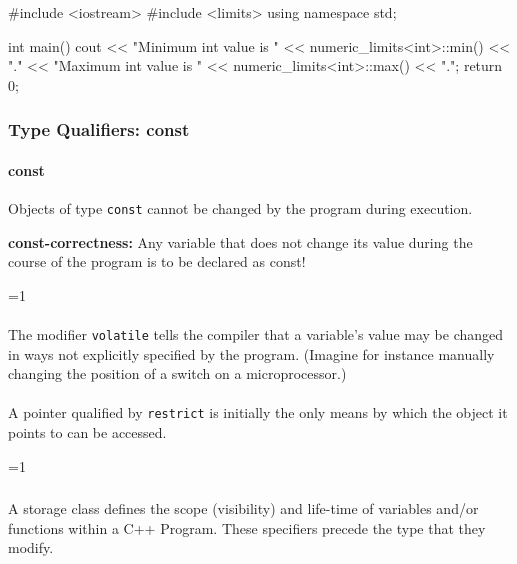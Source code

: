 \documentclass[10pt,a4paper]{scrartcl}
\gdef\conditionmacro{0}
\begin{document}
\begin{multicols*}{2}
\begin{TPCpp}
#include <iostream>
#include <limits>
using namespace std;

int main() {
   cout << "Minimum int value is "
        << numeric_limits<int>::min() << ".\n"
        << "Maximum int value is "
        << numeric_limits<int>::max() << ".\n";
   return 0;
}
\end{TPCpp}

\subsubsection{Type Qualifiers: const }
\label{sec:TypeQualifiersConstVolatileRestrict}


\paragraph{const} Objects of type \verb+const+ cannot be changed by the program during execution.

\vspace{3ex}

\textbf{const-correctness:} Any variable that does not change its value during the course of the program is to be declared as const!

\ifnum\conditionmacro=1
\paragraph{} The modifier \verb+volatile+ tells the compiler that a variable's value may be changed in ways not explicitly specified by the program. (Imagine for instance manually changing the position of a switch on a microprocessor.)
\paragraph{} A pointer qualified by \verb+restrict+ is initially the only means by which the object it points to can be accessed.
\fi

\ifnum\conditionmacro=1
\subsubsection{}
\label{sec:StorageClasses}

A storage class defines the scope (visibility) and life-time of variables and/or functions within a C++ Program. These specifiers precede the type that they modify.


\end{multicols*}
\end{document}
